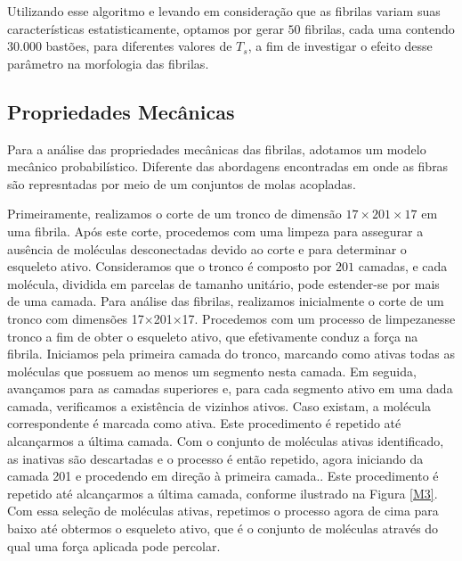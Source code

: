 \documentclass{article}
\begin{document}
        Utilizando esse algoritmo e levando em consideração que as fibrilas variam suas características estatisticamente, optamos por gerar 
        \(50\) fibrilas, cada uma contendo \(30.000\) bastões, para diferentes valores de \(T_{s}\), a fim de investigar 
        o efeito desse parâmetro na morfologia das fibrilas. 


    \subsection{Propriedades Mecânicas} 

        \indent Para a análise das propriedades mecânicas das fibrilas, adotamos um modelo mecânico probabilístico\cite{Parkinson1997}. 
        Diferente das abordagens encontradas em \cite{Saitoh2020MolecularDS} onde as fibras são represntadas por meio de um 
        conjuntos de molas acopladas.
        

        Primeiramente, realizamos o corte de um tronco de dimensão \(17 \times 201 \times 17\) em uma fibrila. Após este 
        corte, procedemos com uma limpeza para assegurar a ausência de moléculas desconectadas devido ao corte e para 
        determinar o esqueleto ativo. Consideramos que o tronco é composto por \(201\) camadas, e cada molécula, dividida 
        em parcelas de tamanho unitário, pode estender-se por mais de uma camada. Para análise das fibrilas, realizamos 
        inicialmente o corte de um tronco com dimensões 17×201×17. Procedemos com um processo de limpezanesse tronco a fim 
        de obter o esqueleto ativo, que efetivamente conduz a força na fibrila. Iniciamos pela primeira camada do tronco, 
        marcando como ativas todas as moléculas que possuem ao menos um segmento nesta camada. Em seguida, avançamos para 
        as camadas superiores e, para cada segmento ativo em uma dada camada, verificamos a existência de vizinhos ativos. 
        Caso existam, a molécula correspondente é marcada como ativa. Este procedimento é repetido até alcançarmos a última 
        camada. Com o conjunto de moléculas ativas identificado, as inativas são descartadas e o processo é então repetido, 
        agora iniciando da camada 201 e procedendo em direção à primeira camada.. Este procedimento é repetido até alcançarmos a última camada, conforme 
        ilustrado na Figura \ref{M3}. Com essa seleção de moléculas ativas, repetimos o processo agora de cima para baixo 
        até obtermos o esqueleto ativo, que é o conjunto de moléculas através do qual uma força aplicada pode percolar. 
\end{document}
